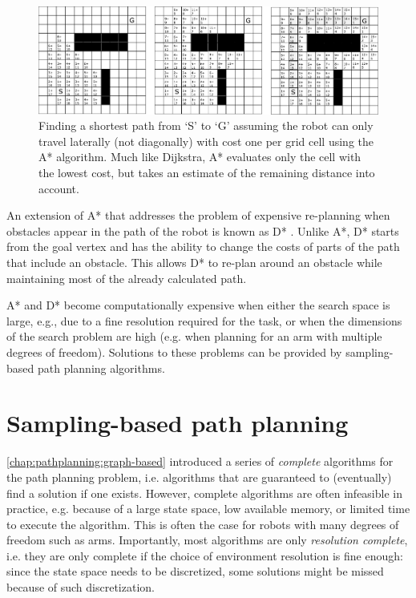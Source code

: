 
\begin{figure}
    \centering
    \includegraphics[width=\textwidth]{figs/astargrid.pdf}
    \caption{Finding a shortest path from `S' to `G' assuming the robot can only travel laterally (not diagonally) with cost one per grid cell using the A* algorithm. Much like Dijkstra, A* evaluates only the cell with the lowest cost, but takes an estimate of the remaining distance into account.\label{fig:astargrid}}
\end{figure}

An extension of A* that addresses the problem of expensive re-planning when obstacles appear in the path of the robot is known as D* \cite{stentz1994optimal}. Unlike A*, D* starts from the goal vertex and has the ability to change the costs of parts of the path that include an obstacle. This allows D* to re-plan around an obstacle while maintaining most of the already calculated path.

A* and D* become computationally expensive when either the search space is large, e.g., due to a fine resolution required for the task, or when the dimensions of the search problem are high (e.g. when planning for an arm with multiple degrees of freedom). Solutions to these problems can be provided by sampling-based path planning algorithms.

\section{Sampling-based path planning}

\cref{chap:pathplanning:graph-based} introduced a series of \textsl{complete} algorithms for the path planning problem, i.e. algorithms that are guaranteed to (eventually) find a solution if one exists.
However, complete algorithms are often infeasible in practice, e.g. because of a large state space, low available memory, or limited time to execute the algorithm. This is often the case for robots with many degrees of freedom such as arms.
Importantly, most algorithms are only \textsl{resolution complete}, i.e. they are only complete if the choice of environment resolution is fine enough: since the state space needs to be discretized, some solutions might be missed because of such discretization.


